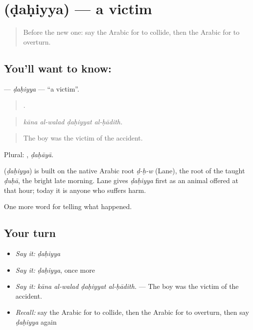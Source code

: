 \section[\texorpdfstring{\ar{ضحية} (ḍaḥiyya)}{ضحية (ḍaḥiyya)}]{ (ḍaḥiyya) — a victim}

\label{lesson:AR-C301-dahiyya}



\begin{quote}
Before the new one: say the Arabic for to collide, then the Arabic for to overturn.
\end{quote}

\subsection*{You'll want to know: }
\textbf{} — \emph{ḍaḥiyya} — \textquotedblleft{}a victim\textquotedblright{}.

\begin{quote}
   .
\end{quote}

\begin{quote}
\emph{kāna al-walad ḍaḥiyyat al-ḥādith.}
\end{quote}

\begin{quote}
The boy was the victim of the accident.
\end{quote}

Plural: , \emph{ḍaḥāyā}.

\begin{cousinweb}
\textbf{} (\emph{ḍaḥiyya}) is built on the native Arabic root \emph{ḍ-ḥ-w} (Lane), the root of the taught \emph{ḍuḥā}, the bright late morning. Lane gives \emph{ḍaḥiyya} first as an animal offered at that hour; today it is anyone who suffers harm.
\end{cousinweb}

\begin{grammarlens}[title={What you've built}]
One more word for telling what happened.
\end{grammarlens}

\subsection*{Your turn}
\begin{itemize}
\raggedright
  \item \emph{Say it:} \emph{ḍaḥiyya}
  \item \emph{Say it:} \emph{ḍaḥiyya}, once more
  \item \emph{Say it:} \emph{kāna al-walad ḍaḥiyyat al-ḥādith.} — The boy was the victim of the accident.
  \item \emph{Recall:} say the Arabic for to collide, then the Arabic for to overturn, then say \emph{ḍaḥiyya} again
\end{itemize}

